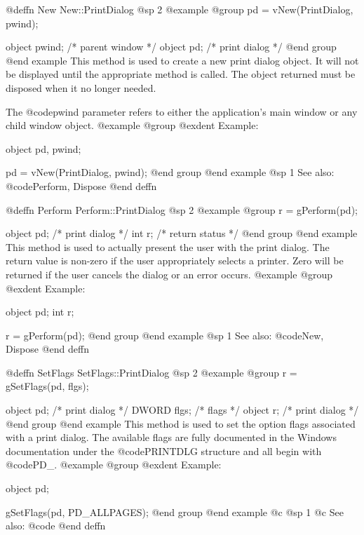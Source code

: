 @deffn {New} New::PrintDialog
@sp 2
@example
@group
pd = vNew(PrintDialog, pwind);

object  pwind;  /*  parent window  */
object  pd;     /*  print dialog   */
@end group
@end example
This method is used to create a new print dialog object.  It will not be
displayed until the appropriate method is called.  The object returned
must be disposed when it no longer needed.

The @code{pwind} parameter refers to either the application's main window
or any child window object.
@example
@group
@exdent Example:

object  pd, pwind;

pd = vNew(PrintDialog, pwind);
@end group
@end example
@sp 1
See also:  @code{Perform, Dispose}
@end deffn












@deffn {Perform} Perform::PrintDialog
@sp 2
@example
@group
r = gPerform(pd);

object  pd;     /*  print dialog   */
int     r;      /*  return status  */
@end group
@end example
This method is used to actually present the user with the print dialog.
The return value is non-zero if the user appropriately selects a printer.
Zero will be returned if the user cancels the dialog or an error occurs.
@example
@group
@exdent Example:

object  pd;
int     r;

r = gPerform(pd);
@end group
@end example
@sp 1
See also:  @code{New, Dispose}
@end deffn







@deffn {SetFlags} SetFlags::PrintDialog
@sp 2
@example
@group
r = gSetFlags(pd, flgs);

object  pd;     /*  print dialog  */
DWORD   flgs;   /*  flags         */
object  r;      /*  print dialog  */
@end group
@end example
This method is used to set the option flags associated with a print dialog.
The available flags are fully documented in the Windows documentation
under the @code{PRINTDLG} structure and all begin with @code{PD_}.
@example
@group
@exdent Example:

object  pd;

gSetFlags(pd, PD_ALLPAGES);
@end group
@end example
@c @sp 1
@c See also:  @code{}
@end deffn















